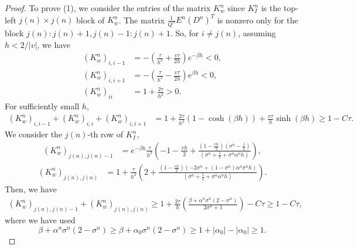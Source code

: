 \documentclass[10pt,a4paper]{amsart}
\newcommand{\abs}[1]{\left\lvert #1 \right\rvert}
\newcommand{\paren}[1]{\left(#1\right)}
\begin{document}
\begin{proof}
To prove (1), we consider the entries of the matrix $K_w^n$ since $K_I^n$ is the top-left $j(n)\times j(n)$ block of $K_w^n$.
The matrix $\frac{1}{Q^n}E^n(D^n)^T$ is nonzero only for the block $j(n):j(n)+1, j(n)-1:j(n)+1$.
So, for $i \neq j(n)$, assuming $h < 2 / \abs{v}$, we have
\begin{align}
    (K_w^n)_{i,i-1} &= -\paren{\frac{\tau}{h^2} + \frac{v \tau}{2 h} } e^{-\beta h} < 0, \\
    (K_w^n)_{i,i+1} &= -\paren{\frac{\tau}{h^2} - \frac{v \tau}{2 h} } e^{\beta h} < 0, \\
    (K_w^n)_{ii} &= 1 + \frac{2\tau}{h^2} > 0.
\end{align}
For sufficiently small $h$,
\begin{equation}
\begin{aligned}
    (K_w^n)_{i,i-1} + (K_w^n)_{i,i} + (K_w^n)_{i,i+1}
    &= 1 + \frac{2\tau}{h^2} \paren{1 - \cosh(\beta h)} + \frac{v \tau}{h} \sinh(\beta h)  \ge 1 - C \tau.
\end{aligned}
\end{equation}
We consider the $j(n)$-th row of $K_I^n$,
\begin{equation}
\begin{aligned}
    (K_w^n)_{j(n),j(n)-1} &= e^{-\beta h}\frac{\tau}{h^2}\paren{ -1 - \frac{vh}{2} + \frac{\paren{1-\frac{vh}{2}} \paren{\sigma^n-\frac{1}{2}} }{\paren{\sigma^n+\frac{1}{2}+\sigma^n\alpha^nh} } },
\end{aligned}
\end{equation}
\begin{equation}
\begin{aligned}
    (K_w^n)_{j(n),j(n)} &=  1 + \frac{\tau}{h^2}\paren{2 + \frac{\paren{1-\frac{vh}{2}} \paren{-2\sigma^n+\paren{1-\sigma^n}\alpha^n\sigma^nh} }{\paren{\sigma^n+\frac{1}{2}+\sigma^n\alpha^nh} }}.
\end{aligned}
\end{equation}
Then, we have
\begin{equation}
\begin{aligned}
    (K_w^n)_{j(n),j(n)-1} + (K_w^n)_{j(n),j(n)}  \ge 1 + \frac{2\tau}{h} \paren{  \frac{\beta + \alpha^n\sigma^n(2-\sigma^n)}{2\sigma^n+1} }- C\tau\ge 1 - C\tau,
\end{aligned}
\end{equation}
where we have used
\begin{equation}
    \beta + \alpha^n\sigma^n(2-\sigma^n) \ge \beta + \alpha_0\sigma^n(2-\sigma^n) \ge 1 +\abs{\alpha_0} - \abs{\alpha_0}  \ge 1.

\end{equation}
\end{proof}
\end{document}
